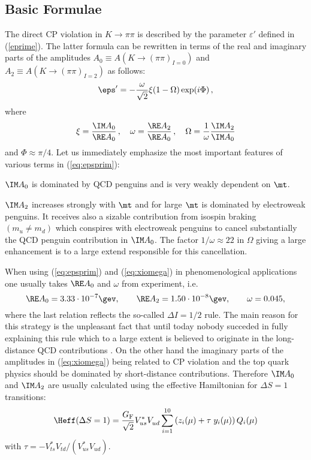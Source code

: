 \subsection{Basic Formulae}
           \label{subsec:epeformulae}
The direct CP violation in $K \to \pi\pi$ is described by the parameter
$\varepsilon'$ defined in (\ref{eprime}).
The latter formula  can be rewritten 
in terms of the real and imaginary parts of 
the amplitudes $A_0 \equiv
A(K \to (\pi\pi)_{I=0})$ and $A_2 \equiv
A(K \to (\pi\pi)_{I=2})$ as follows:
\begin{equation}
\eps' = -\frac{\omega}{\sqrt{2}} \xi (1 - \Omega) \exp(i \Phi) \, ,
\label{eq:epsprim}
\end{equation}
where
\begin{equation}
\xi = \frac{\IM A_0}{\RE A_0} \, , \quad
\omega = \frac{\RE A_2}{\RE A_0} \, , \quad
\Omega = \frac{1}{\omega} \frac{\IM A_2}{\IM A_0}
\label{eq:xiomega}
\end{equation}
and $\Phi \approx \pi/4$. Let us immediately emphasize the most 
important features
of various terms in (\ref{eq:epsprim}):
\bi
\item
$\IM A_0$ is dominated by QCD penguins and is very weakly dependent
on $\mt$. 
\item
$\IM A_2$ increases strongly with $\mt$
and for large $\mt$ is dominated by electroweak penguins. It receives
also a sizable contribution from isospin braking $(m_u\not=m_d)$ which
conspires with electroweak penguins to cancel substantially the
QCD penguin contribution in $\IM A_0$. 
The factor $1/\omega\approx 22$
in $\Omega$ giving a large enhancement is to a large extend responsible
for this cancellation.
\ei

When using (\ref{eq:epsprim}) and (\ref{eq:xiomega}) in phenomenological
applications one usually takes $\RE A_0$ and $\omega$ from
experiment, i.e.
\begin{equation}
\RE A_0 = 3.33 \cdot 10^{-7}\gev,
\qquad
\RE A_2 = 1.50 \cdot 10^{-8}\gev,
\qquad
\omega = 0.045,
\label{eq:ReA0data}
\end{equation}
where the last relation reflects the so-called $\Delta I=1/2$ rule. The
main reason for this strategy is the unpleasant fact that until today
nobody succeded in fully explaining this rule which to a large extent is
believed to originate in the long-distance QCD contributions
\cite{DI12}. 
On the other hand the
imaginary parts of the amplitudes in (\ref{eq:xiomega}) being related to
CP violation and the top quark physics should be dominated by
short-distance contributions. Therefore $\IM A_0$ and $\IM A_2$ are
usually calculated using the effective Hamiltonian for $\Delta S=1$
transitions:
\begin{equation}
\Heff(\Delta S=1) = 
\frac{G_{\rm F}}{\sqrt{2}} V_{us}^* V_{ud}^{} \sum_{i=1}^{10}
\left( z_i(\mu) + \tau \; y_i(\mu) \right) Q_i(\mu) 
\label{eq:HeffdF1:1010}
\end{equation}
with $\tau=-V_{ts}^* V_{td}^{}/(V_{us}^* V_{ud}^{})$.

